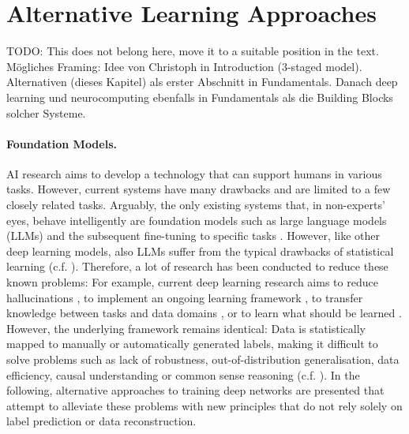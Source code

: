 
\section{Alternative Learning Approaches}
TODO: This does not belong here, move it to a suitable position in the text.
Mögliches Framing: Idee von Christoph in Introduction (3-staged model). Alternativen (dieses Kapitel) als erster Abschnitt in Fundamentals. Danach deep learning und neurocomputing ebenfalls in Fundamentals als die Building Blocks solcher Systeme.

\paragraph{Foundation Models.} AI research aims to develop a technology that can support humans in various tasks. However, current systems have many drawbacks and are limited to a few closely related tasks. Arguably, the only existing systems that, in non-experts' eyes, behave intelligently are foundation models such as large language models (LLMs) \cite{NEURIPS2020_1457c0d6, Touvron_Lavril_Izacard_Martinet_Lachaux_Lacroix_Rozière_Goyal_Hambro_Azhar} and the subsequent fine-tuning to specific tasks \cite{Ouyang_Wu_Jiang_Almeida_Wainwright_Mishkin_Zhang_Agarwal_Slama_Ray}. However, like other deep learning models, also LLMs suffer from the typical drawbacks of statistical learning (c.f. ). Therefore, a lot of research has been conducted to reduce these known problems: For example, current deep learning research aims to reduce hallucinations \cite{Feldman_Foulds_Pan_2023, Manakul_Liusie_Gales_2023}, to implement an ongoing learning framework \cite{Sahoo_Pham_Lu_Hoi_2017, Hoi_Sahoo_Lu_Zhao_2021}, to transfer knowledge between tasks and data domains \cite{Zhuang_Qi_Duan_Xi_Zhu_Zhu_Xiong_He_2021, Sager_Salzmann_Burn_Stadelmann_2022}, or to learn what should be learned \cite{Thrun_Pratt_1998, Hospedales_Antoniou_Micaelli_Storkey_2021}. However, the underlying framework remains identical: Data is statistically mapped to manually or automatically generated labels, making it difficult to solve problems such as lack of robustness,  out-of-distribution generalisation, data efficiency, causal understanding or common sense reasoning (c.f. ). In the following, alternative approaches to training deep networks are presented that attempt to alleviate these problems with new principles that do not rely solely on label prediction or data reconstruction. 

